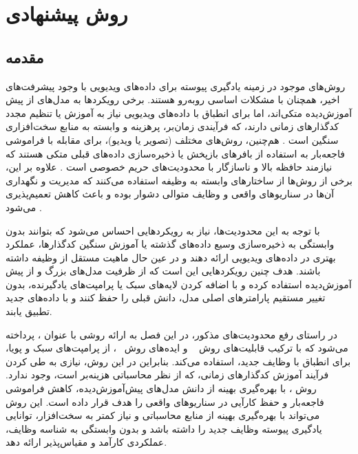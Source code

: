 \chapter{روش پیشنهادی}
\label{chap3:proposed_method}

\section{مقدمه}

روش‌های موجود در زمینه یادگیری پیوسته برای داده‌های ویدیویی با وجود پیشرفت‌های اخیر، همچنان با مشکلات اساسی روبه‌رو هستند. برخی رویکردها به مدل‌های از پیش آموزش‌دیده متکی‌اند، اما برای انطباق با داده‌های ویدیویی نیاز به آموزش یا تنظیم مجدد کدگذارهای زمانی دارند، که فرآیندی زمان‌بر، پرهزینه و وابسته به منابع سخت‌افزاری سنگین است \cite{pivot}. هم‌چنین، روش‌های مختلف (تصویر یا ویدیو)، برای مقابله با فراموشی فاجعه‌بار به استفاده از بافرهای بازپخش یا ذخیره‌سازی داده‌های قبلی متکی هستند که نیازمند حافظه بالا و ناسازگار با محدودیت‌های حریم خصوصی است
\cite{pivot,9,memory-1}
. علاوه بر این، برخی از روش‌ها از ساختارهای وابسته به وظیفه
استفاده می‌کنند که مدیریت و نگهداری آن‌ها در سناریوهای واقعی و وظایف متوالی دشوار بوده و باعث کاهش تعمیم‌پذیری می‌شود \cite{task-specific-1,task-specific-2}.

با توجه به این محدودیت‌ها، نیاز به رویکردهایی احساس می‌شود که بتوانند بدون وابستگی به ذخیره‌سازی وسیع داده‌های گذشته یا آموزش سنگین کدگذارها، عملکرد بهتری در داده‌های ویدیویی ارائه دهند و در عین حال ماهیت مستقل از وظیفه
 داشته باشند. هدف چنین رویکردهایی این است که از ظرفیت مدل‌های بزرگ و از پیش آموزش‌دیده استفاده کرده و با اضافه کردن لایه‌های سبک یا پرامپت‌های یادگیرنده، بدون تغییر مستقیم پارامتر‌های اصلی مدل، دانش قبلی را حفظ کنند و با داده‌های جدید تطبیق یابند.

در راستای رفع محدودیت‌های مذکور، در این فصل به ارائه روشی با عنوان
،
پرداخته‌ می‌شود که با ترکیب قابلیت‌های روش
~\cite{open-vclip}
و ایده‌های روش
~\cite{l2p}، 
از پرامپت‌های سبک و پویا، برای انطباق با وظایف جدید، استفاده می‌کند. بنابراین در این روش، نیازی به طی کردن فرآیند آموزش کدگذارهای زمانی، که از نظر محاسباتی هزینه‌بر است، وجود ندارد.
روش ، با بهره‌گیری بهینه از دانش مدل‌های پیش‌آموزش‌دیده، کاهش فراموشی فاجعه‌بار و حفظ کارآیی در سناریوهای واقعی را هدف قرار داده است. این روش می‌تواند با بهره‌گیری بهینه از منابع محاسباتی و نیاز کمتر به سخت‌افزار، توانایی یادگیری پیوسته وظایف جدید را داشته باشد و بدون وابستگی به شناسه وظایف، عملکردی کارآمد و مقیاس‌پذیر ارائه دهد.

